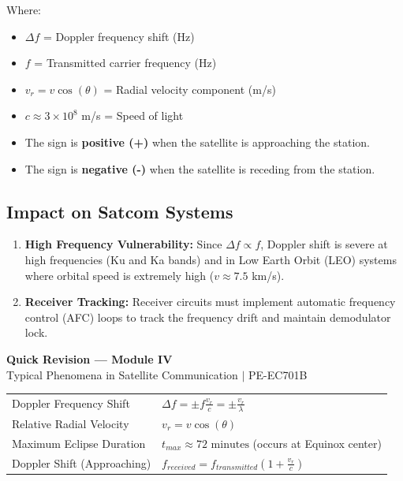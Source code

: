 \documentclass[12pt,a4paper]{article}
\renewcommand{\arraystretch}{1.45}
\begin{document}
Where:
\begin{itemize}[leftmargin=*, itemsep=3pt]
  \item $\Delta f$ = Doppler frequency shift (Hz)
  \item $f$ = Transmitted carrier frequency (Hz)
  \item $v_r = v \cos(\theta)$ = Radial velocity component (m/s)
  \item $c \approx 3 \times 10^8$ m/s = Speed of light
  \item The sign is \textbf{positive (+)} when the satellite is approaching the station.
  \item The sign is \textbf{negative (-)} when the satellite is receding from the station.
\end{itemize}

\subsection{Impact on Satcom Systems}
\begin{enumerate}[label=\textbf{\arabic*.}, leftmargin=*, itemsep=3pt]
  \item \textbf{High Frequency Vulnerability:} Since $\Delta f \propto f$, Doppler shift is severe at high frequencies (Ku and Ka bands) and in Low Earth Orbit (LEO) systems where orbital speed is extremely high ($v \approx 7.5$ km/s).
  \item \textbf{Receiver Tracking:} Receiver circuits must implement automatic frequency control (AFC) loops to track the frequency drift and maintain demodulator lock.
\end{enumerate}

\newpage
\begin{center}
  {\large\bfseries\color{myred} Quick Revision --- Module IV}\\[3pt]
  {\small\color{mydark} Typical Phenomena in Satellite Communication $|$ PE-EC701B}
\end{center}
\noindent{\color{myred}\rule{\linewidth}{1.2pt}}
\vspace{4pt}

\begin{tcolorbox}[formulabox, title={\textbf{Key Formulas at a Glance}}]
\renewcommand{\arraystretch}{1.9}
\begin{tabularx}{\linewidth}{B{5.0cm} X}Doppler Frequency Shift & $\displaystyle \Delta f = \pm f \frac{v_r}{c} = \pm \frac{v_r}{\lambda}$ \\[4pt]
Relative Radial Velocity & $v_r = v \cos(\theta)$ \\[4pt]
Maximum Eclipse Duration & $t_{max} \approx 72 \text{ minutes}$ (occurs at Equinox center) \\[4pt]
Doppler Shift (Approaching) & $\displaystyle f_{received} = f_{transmitted} \left( 1 + \frac{v_r}{c} \right)$
\end{tabularx}
\end{tcolorbox}
\end{document}

